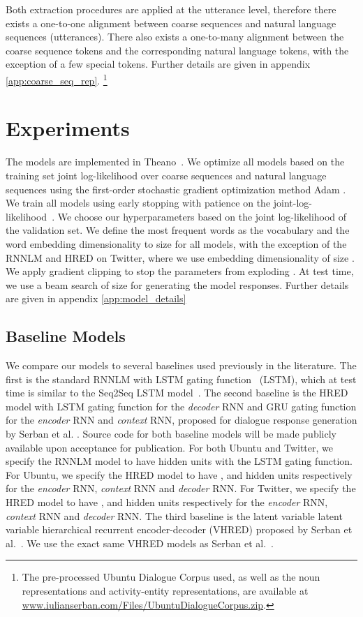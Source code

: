 \documentclass{article}
\begin{document}
Both extraction procedures are applied at the utterance level, therefore there exists a one-to-one alignment between coarse sequences and natural language sequences (utterances).
There also exists a one-to-many alignment between the coarse sequence tokens and the corresponding natural language tokens, with the exception of a few special tokens.
Further details are given in appendix \ref{app:coarse_seq_rep}. \footnote{The pre-processed Ubuntu Dialogue Corpus used, as well as the noun representations and activity-entity representations, are available at \url{www.iulianserban.com/Files/UbuntuDialogueCorpus.zip}.}
 
\section{Experiments}
The models are implemented in Theano~\cite{2016arXiv160502688short}.
We optimize all models based on the training set joint log-likelihood over coarse sequences and natural language sequences 
using the first-order stochastic gradient optimization method Adam \cite{kingma2014adampublished}. 
We train all models using early stopping with patience on the joint-log-likelihood~\cite{bengio2012practical}.
We choose our hyperparameters based on the joint log-likelihood of the validation set.
We define the  most frequent words as the vocabulary and the word embedding dimensionality to size  for all models, with the exception of the RNNLM and HRED on Twitter, where we use embedding dimensionality of size .
We apply gradient clipping to stop the parameters from exploding \cite{pascanu2012difficulty}.
At test time, we use a beam search of size  for generating the model responses.
Further details are given in appendix \ref{app:model_details}


\subsection{Baseline Models}
We compare our models to several baselines used previously in the literature.
The first is the standard RNNLM with LSTM gating function~\cite{mikolov2010recurrent} (LSTM),
which at test time is similar to the Seq2Seq LSTM model~\cite{sutskever2014sequence}.
The second baseline is the HRED model with LSTM gating function for the \textit{decoder} RNN and GRU gating function for the \textit{encoder} RNN and \textit{context} RNN,
proposed for dialogue response generation by Serban et al.\@\cite{DBLP:conf/aaai/SerbanSBCP16} \cite{sordoni2015ahier}.
Source code for both baseline models will be made publicly available upon acceptance for publication.
For both Ubuntu and Twitter, we specify the RNNLM model to have  hidden units with the LSTM gating function.
For Ubuntu, we specify the HRED model to have ,  and  hidden units respectively for the \textit{encoder} RNN, \textit{context} RNN and \textit{decoder} RNN.
For Twitter, we specify the HRED model to have ,  and  hidden units respectively for the \textit{encoder} RNN, \textit{context} RNN and \textit{decoder} RNN.
The third baseline is the latent variable latent variable hierarchical recurrent encoder-decoder (VHRED) proposed by Serban et al.~\cite{serban2016hierarchical}.
We use the exact same VHRED models as Serban et al.~\cite{serban2016hierarchical}.
\end{document}
